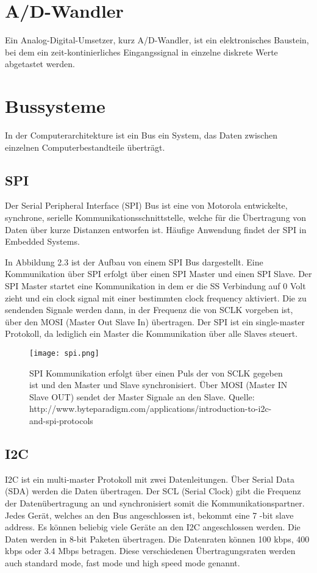 \section{A/D-Wandler}

Ein Analog-Digital-Umsetzer, kurz A/D-Wandler, ist ein elektronisches Baustein, bei dem ein zeit-kontinierliches Eingangssignal in einzelne diskrete Werte abgetastet werden.

\section{Bussysteme}
In der Computerarchitekture ist ein Bus ein System, das Daten zwischen einzelnen Computerbestandteile überträgt.

\subsection{SPI}

Der Serial Peripheral Interface (SPI) Bus ist eine von Motorola entwickelte,  synchrone, serielle Kommunikationsschnittstelle, welche für die Übertragung von Daten über kurze Distanzen entworfen ist.  Häufige Anwendung findet der SPI in Embedded Systems. 

In Abbildung 2.3 ist der Aufbau von einem SPI Bus dargestellt.
Eine Kommunikation über SPI erfolgt über einen SPI Master und einen SPI Slave. Der SPI Master startet eine Kommunikation in dem er die SS Verbindung auf 0 Volt zieht und ein clock signal mit einer bestimmten clock frequency aktiviert. Die zu sendenden Signale werden dann, in der Frequenz die von SCLK vorgeben ist, über den MOSI (Master Out Slave In) übertragen. Der SPI ist ein single-master Protokoll, da lediglich ein Master die Kommunikation über alle Slaves steuert.

\begin{figure}[h]
  \centering
  \texttt{[image: spi.png]}
  \caption{SPI Kommunikation erfolgt über einen Puls der von SCLK gegeben ist und den Master und Slave synchronisiert. Über MOSI (Master IN Slave OUT) sendet der Master Signale an den Slave. Quelle: http://www.byteparadigm.com/applications/introduction-to-i2c-and-spi-protocols}
  \label{Kap1:SPI}
\end{figure}

\subsection{I2C}

I2C ist ein multi-master Protokoll mit zwei Datenleitungen. Über Serial Data (SDA) werden die Daten übertragen. Der SCL (Serial Clock) gibt die Frequenz der Datenübertragung an und synchronisiert somit die Kommunikationspartner. Jedes Gerät, welches an den Bus angeschlossen ist, bekommt eine 7 -bit slave address. Es können beliebig viele Geräte an den I2C angeschlossen werden. Die Daten werden in 8-bit Paketen übertragen. Die Datenraten können 100 kbps, 400 kbps oder 3.4 Mbps betragen. Diese verschiedenen Übertragungsraten werden auch standard mode, fast mode und high speed mode genannt.

